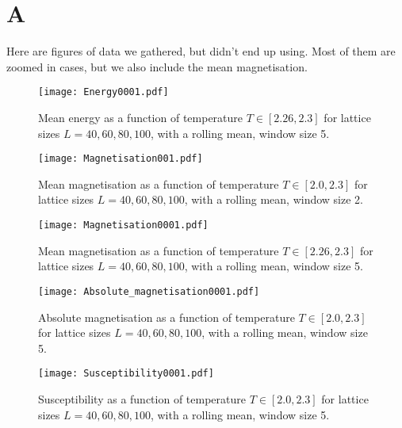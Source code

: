 \setcounter{equation}{0}
\renewcommand\theequation{A.\arabic{equation}}
\section*{A}
\label{sec:appendix}

Here are figures of data we gathered, but didn't end up using. Most of them are zoomed in cases, but we also include the mean magnetisation.

\begin{figure}[htbp]
	\centering
	\texttt{[image: Energy0001.pdf]}
	\caption{Mean energy as a function of temperature $T\in[2.26, 2.3]$ for lattice sizes $L= 40, 60, 80, 100$, with a rolling mean, window size 5.}
\end{figure}

\begin{figure}[htbp]
	\centering
	\texttt{[image: Magnetisation001.pdf]}
	\caption{Mean magnetisation as a function of temperature $T\in[2.0, 2.3]$ for lattice sizes $L= 40, 60, 80, 100$, with a rolling mean, window size 2.}
\end{figure}

\begin{figure}[htbp]
	\centering
	\texttt{[image: Magnetisation0001.pdf]}
	\caption{Mean magnetisation as a function of temperature $T\in[2.26, 2.3]$ for lattice sizes $L= 40, 60, 80, 100$, with a rolling mean, window size 5.}
\end{figure}

\begin{figure}[htbp]
	\centering
	\texttt{[image: Absolute\_magnetisation0001.pdf]}
	\caption{Absolute magnetisation as a function of temperature $T\in[2.0, 2.3]$ for lattice sizes $L= 40, 60, 80, 100$, with a rolling mean, window size 5.}
\end{figure}

\begin{figure}[htbp]
	\centering
	\texttt{[image: Susceptibility0001.pdf]}
	\caption{Susceptibility as a function of temperature $T\in[2.0, 2.3]$ for lattice sizes $L= 40, 60, 80, 100$, with a rolling mean, window size 5.}
\end{figure}
